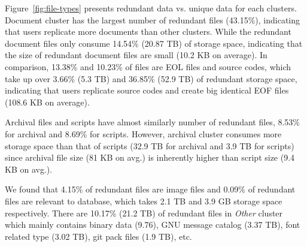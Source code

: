 Figure~\ref{fig:file-types} presents redundant data vs. unique data for each clusters. 
Document cluster has the largest number of redundant files (43.15\%), indicating that users replicate more documents than other clusters. While the redundant document files only consume 14.54\% (20.87 TB) of storage space, indicating that the size of redundant document files are small (10.2 KB on average). In comparison, 13.38\% and 10.23\% of files are EOL files and source codes, which take up over 3.66\% (5.3 TB) and 36.85\% (52.9 TB) of redundant storage space, indicating that users replicate source codes and create big identical EOF files (108.6 KB on average).

Archival files and scripts have almost similarly number of redundant files, 8.53\% for archival and 8.69\% for scripts. However, archival cluster consumes more storage space than that of scripts (32.9 TB for archival and 3.9 TB for scripts) since archival file size (81 KB on avg.) is inherently higher than script size (9.4 KB on avg.).

We found that 4.15\% of redundant files are image files and 0.09\% of redundant files are relevant to database, which takes 2.1 TB and 3.9 GB storage space respectively. There are 10.17\% (21.2 TB) of redundant files in \textit{Other} cluster which mainly contains binary data (9.76), GNU message catalog (3.37 TB), font related type (3.02 TB), git pack files (1.9 TB), etc. 

